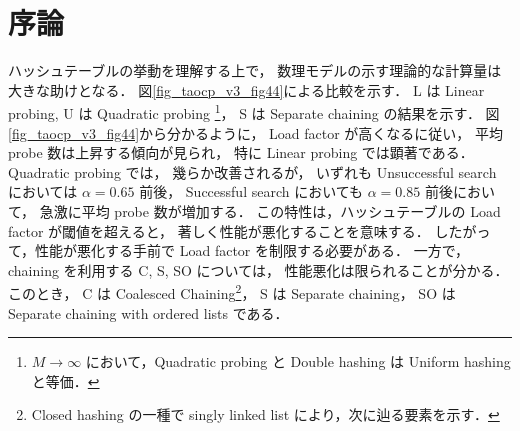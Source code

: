 \chapter{序論}
\label{chap_Introduction}

ハッシュテーブルの挙動を理解する上で，
数理モデルの示す理論的な計算量は大きな助けとなる．
図\ref{fig_taocp_v3_fig44}に\cite{knuth1998}よる比較を示す．
L は Linear probing,
U は Quadratic probing \footnote{$M \rightarrow \infty$ において，Quadratic probing と Double hashing は Uniform hashing と等価．}，
S は Separate chaining の結果を示す．
図\ref{fig_taocp_v3_fig44}から分かるように，
Load factor が高くなるに従い，
平均 probe 数は上昇する傾向が見られ，
特に Linear probing では顕著である．
Quadratic probing では，
幾らか改善されるが，
いずれも
Unsuccessful search においては $\alpha = 0.65$ 前後，
Successful search においても $\alpha = 0.85$ 前後において，
急激に平均 probe 数が増加する．
この特性は，ハッシュテーブルの Load factor が閾値を超えると，
著しく性能が悪化することを意味する．
したがって，性能が悪化する手前で Load factor を制限する必要がある．
一方で，chaining を利用する C, S, SO については，
性能悪化は限られることが分かる．
このとき，
C は Coalesced Chaining\footnote{Closed hashing の一種で singly linked list により，次に辿る要素を示す．}，
S は Separate chaining，
SO は Separate chaining with ordered lists である．





